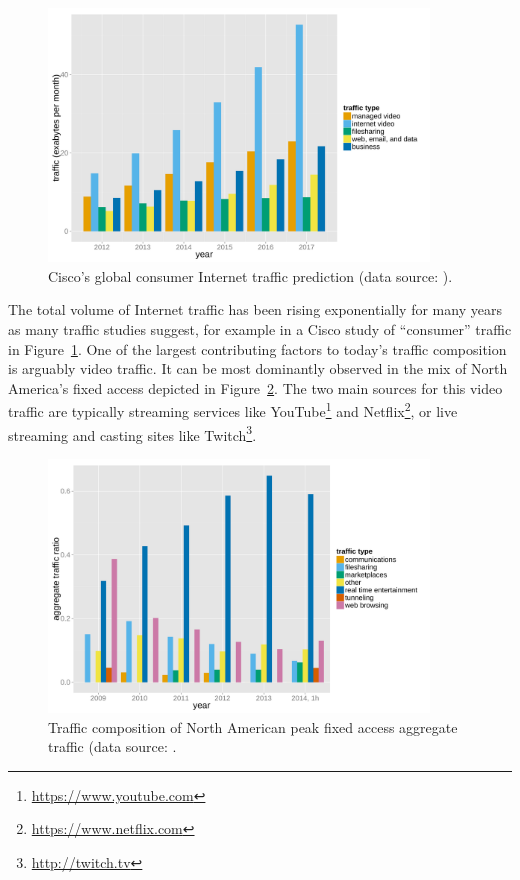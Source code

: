 \begin{figure}[htb]
    \centering
    \includegraphics[width=0.9\textwidth]{images/r-cisco-vni-2013.pdf}
    \caption{Cisco's global consumer Internet traffic prediction (data source: \cite{cisco2013VNI}).}
\label{c1:fig:traffic-cisco}
\end{figure}

The total volume of Internet traffic has been rising exponentially for many years as many traffic studies suggest, for example in a Cisco study of ``consumer'' traffic in Figure~\ref{c1:fig:traffic-cisco}. One of the largest contributing factors to today's traffic composition is arguably video traffic. It can be most dominantly observed in the mix of North America's fixed access depicted in Figure~\ref{c1:fig:traffic-netvine-fixed}. The two main sources for this video traffic are typically streaming services like YouTube\footnote{\url{https://www.youtube.com}} and Netflix\footnote{\url{https://www.netflix.com}}, or live streaming and casting sites like Twitch\footnote{\url{http://twitch.tv}}. 

\begin{figure}[htb]
    \centering
    \includegraphics[width=0.9\textwidth]{images/r-netvine-phenomena-fixed.pdf}
    \caption{Traffic composition of North American peak fixed access aggregate traffic (data source: \cite{sandvine_internetphenomena}.} %
\label{c1:fig:traffic-netvine-fixed}
\end{figure}

